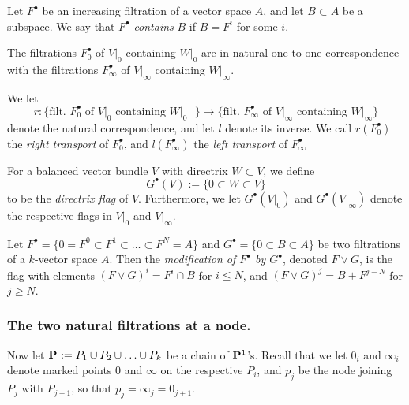 \documentclass[11pt, two side, letterpaper, final]{amsart}
\renewcommand{\P}{{\bf P}}
\newcommand {\from}{\colon}
\newcommand{\chain}[1]{\P_{#1}}
\begin{document}
\begin{definition}
Let $F^{\bullet}$ be an increasing filtration of a vector space $A$, and let $B \subset A$ be a subspace.  We say that $F^{\bullet}$ \emph{contains} $B$ if $B = F^{i}$ for some $i$. 
\end{definition}

\begin{corollary}\label{flag_transport}
The filtrations $F^{\bullet}_{0}$ of $V|_{0}$ containing $W|_{0}$ are in natural one to one correspondence with the filtrations $F^{\bullet}_{\infty}$ of $V|_{\infty}$ containing $W|_{\infty}$.
\end{corollary}

We let \[r \from \big\{\text{filt. $F^{\bullet}_{0}$ of $V|_{0}$ containing $W|_{0}$ }\big\} \to \big\{\text{filt. $F^{\bullet}_{\infty}$ of $V|_{\infty}$ containing $W|_{\infty}$}\big\}\] denote the natural correspondence, and let $l$ denote its inverse. We call $r(F^{\bullet}_{0})$ the \emph{right transport} of $F^{\bullet}_{0}$, and $l(F^{\bullet}_{\infty})$ the \emph{left transport} of $F^{\bullet}_{\infty}$

For a balanced vector bundle $V$ with directrix $W \subset V$, we define \[G^{\bullet}(V):= \{0 \subset W \subset V\}\] to be the \emph{directrix flag} of $V$.  Furthermore, we let $G^{\bullet}(V|_{0})$ and $G^{\bullet}(V|_{\infty})$ denote the respective flags in $V|_{0}$ and $V|_{\infty}$.



\begin{definition}\label{refine}
Let $F^{\bullet} = \{0 = F^{0} \subset F^{1} \subset \ldots \subset F^{N} = A\}$ and $G^{\bullet} =\{0  \subset B \subset A\}$ be two filtrations of a $k$-vector space $A$. Then the \emph{modification of $F^{\bullet}$ by $G^{\bullet}$}, denoted $F \vee G$, is the flag with elements $(F \vee G)^{i} = F^{i} \cap B$ for $i \leq N$, and $(F \vee G)^{j} = B+F^{j-N}$ for $j \geq N$.  
\end{definition}

\subsubsection{The two natural filtrations at a node.}
\label{subsub-the-two-natural-filtrations}
Now let $\chain{} := P_1 \cup P_2 \cup \ldots \cup P_k$ be a chain of $\P^1$'s.  Recall that we let $0_{i}$ and $\infty_{i}$ denote marked points $0$ and $\infty$ on the respective $P_{i}$, and $p_{j}$ be the node joining $P_{j}$ with $P_{j+1}$, so that $p_{j} = \infty_{j} = 0_{j+1}$.  
\end{document}
